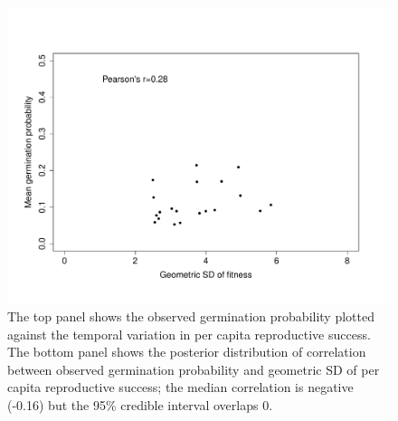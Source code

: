 \documentclass[12pt, oneside, titlepage]{article}   	%
\begin{document}
 \begin{figure}
\centering
       \includegraphics[page=1,width=1\textwidth]{../figures/germ_rs_correlation.pdf}  
 \caption{ The top panel shows the observed germination probability plotted against the temporal variation in per capita reproductive success. The bottom panel shows the posterior distribution of correlation between observed germination probability and geometric SD of per capita reproductive success; the median correlation is negative (-0.16) but the 95\% credible interval overlaps 0. }
   \label{fig:germ_rs_correlation}
 \end{figure}
 
\end{document}
